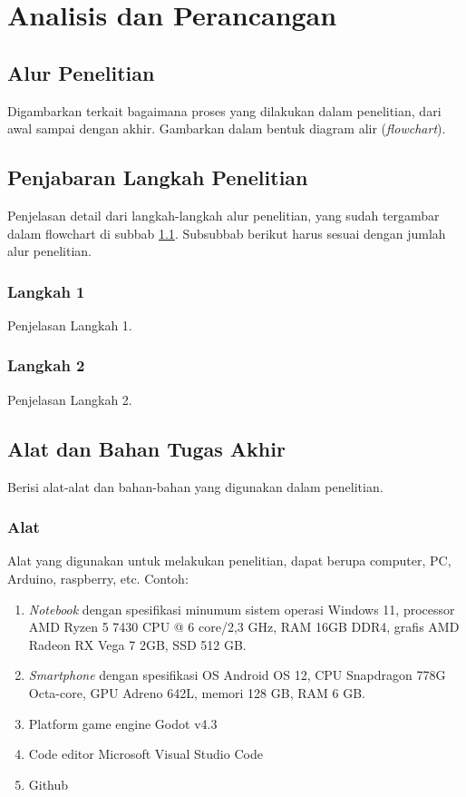 \newpage
\chapter{Analisis dan Perancangan} \label{Bab III}

\section{Alur Penelitian} \label{III.Alur}
Digambarkan terkait bagaimana proses yang dilakukan dalam penelitian, dari awal sampai dengan akhir. Gambarkan dalam bentuk diagram alir (\textit{flowchart}). \par

\section{Penjabaran Langkah Penelitian} \label{III.Jabar Alur}
Penjelasan detail dari langkah-langkah alur penelitian, yang sudah tergambar dalam flowchart di subbab \ref{III.Alur}. Subsubbab berikut harus sesuai dengan jumlah alur penelitian. \par

\subsection{Langkah 1} \label{III.Langkah 1}
Penjelasan Langkah 1. \par

\subsection{Langkah 2} \label{III.Langkah 2}
Penjelasan Langkah 2. \par

\section{Alat dan Bahan Tugas Akhir} \label{III.Alat dan Bahan}
Berisi alat-alat dan bahan-bahan yang digunakan dalam penelitian. \par

\subsection{Alat} \label{III.Alat}
Alat yang digunakan untuk melakukan penelitian, dapat berupa computer, PC, Arduino, raspberry, etc. Contoh: \par
\begin{enumerate}[noitemsep]
	\item \textit{Notebook} dengan spesifikasi minumum sistem operasi Windows 11, processor AMD Ryzen 5 7430 CPU @ 6 core/2,3 GHz, RAM 16GB DDR4, grafis AMD Radeon RX Vega 7 2GB, SSD 512 GB.
	\item \textit{Smartphone} dengan spesifikasi OS Android OS 12, CPU Snapdragon 778G Octa-core, GPU Adreno 642L, memori 128 GB, RAM 6 GB.
	\item Platform game engine Godot v4.3
	\item Code editor Microsoft Visual Studio Code
	\item Github
\end{enumerate}

